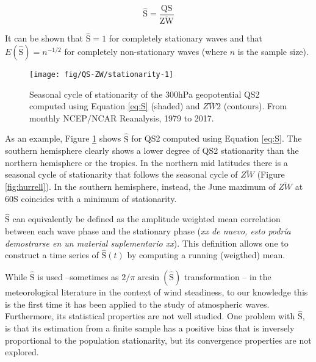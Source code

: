 \documentclass[draft,linenumbers]{agujournal2018}
\begin{document}
\begin{linenomath*}
\begin{equation}\label{eq:S}
\hat{\mathrm{S}} = \frac{\mathrm{QS}}{\overline{\mathrm{ZW}}}
\end{equation}
\end{linenomath*}

It can be shown that \(\hat{\mathrm{S}} = 1\) for completely stationary
waves and that \(E(\hat{\mathrm{S}}) = n^{-1/2}\) for completely
non-stationary waves (where \(n\) is the sample size).

\begin{figure}[h]

{\centering \texttt{[image: fig/QS-ZW/stationarity-1]} 

}

\caption{Seasonal cycle of stationarity of the 300hPa geopotential QS2 computed using Equation \ref{eq:S} (shaded) and $\overline{ZW2}$ (contours). From monthly NCEP/NCAR Reanalysis, 1979 to 2017.}\label{fig:stationarity}
\end{figure}

As an example, Figure \ref{fig:stationarity} shows \(\hat{\mathrm{S}}\)
for QS2 computed using Equation \ref{eq:S}. The southern hemisphere
clearly shows a lower degree of QS2 stationarity than the northern
hemisphere or the tropics. In the northern mid latitudes there is a
seasonal cycle of stationarity that follows the seasonal cycle of
\(\overline{ZW}\) (Figure \ref{fig:hurrell}). In the southern
hemisphere, instead, the June maximum of \(\overline{ZW}\) at
60\degree S coincides with a minimum of stationarity.

\(\hat{\mathrm{S}}\) can equivalently be defined as the amplitude
weighted mean correlation between each wave phase and the stationary
phase (\emph{xx de nuevo, esto podría demostrarse en un material
suplementario xx}). This definition allows one to construct a time
series of \(\hat{\mathrm{S}}(t)\) by computing a running (weigthed)
mean.

While \(\hat{\mathrm{S}}\) is used --sometimes as
\(2/\pi\arcsin \left (\hat{\mathrm{S}} \right )\) transformation
\citep{Singer1967}-- in the meteorological literature in the context of
wind steadiness, to our knowledge this is the first time it has been
applied to the study of atmospheric waves. Furthermore, its statistical
properties are not well studied. One problem with \(\hat{\mathrm{S}}\),
is that its estimation from a finite sample has a positive bias that is
inversely proportional to the population stationarity, but its
convergence properties are not explored.
\end{document}
